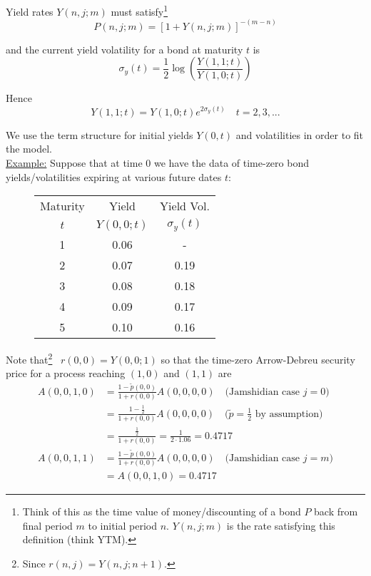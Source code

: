 \documentclass[12pt]{article}
\newlength\tindent
\renewcommand{\indent}{\hspace*{\tindent}}
\begin{document}
Yield rates $Y(n,j;m)$ must satisfy\footnote{Think of this as the time value of money/discounting of a bond $P$ back from final period $m$ to initial period $n$. $Y(n,j;m)$ is the rate satisfying this definition (think YTM).}
\begin{equation*}
	P(n,j;m) = [1 + Y(n,j;m)]^{-(m-n)}
\end{equation*}

and the current yield volatility for a bond at maturity $t$ is
\begin{equation*}
	\sigma_y(t) = \frac{1}{2} \log \left( \frac{Y(1,1;t)}{Y(1,0;t)} \right)
\end{equation*}

Hence
\begin{equation*}
	Y(1,1;t) = Y(1,0;t)e^{2\sigma_y(t)} \quad t = 2,3,...
\end{equation*}

We use the term structure for initial yields $Y(0,t)$ and volatilities in order to fit the model. \\

\underline{Example:} Suppose that at time 0 we have the data of time-zero bond yields/volatilities expiring at various future dates $t$:
\begin{figure}[H]
\centering
\begin{tabular}{ccc}
\hline
	Maturity & Yield & Yield Vol. \\
	$t$ & $Y(0,0;t)$ & $\sigma_y(t)$ \\
\hline
	1 & 0.06 & - \\
	2 & 0.07 & 0.19 \\
	3 & 0.08 & 0.18 \\
	4 & 0.09 & 0.17 \\
	5 & 0.10 & 0.16	
\end{tabular}
\end{figure}

\indent Note that\footnote{Since $r(n,j) = Y(n,j;n + 1)$.}~ $r(0,0) = Y(0,0;1)$ so that the time-zero Arrow-Debreu security price for a process reaching $(1,0)$ and $(1,1)$ are 
\begin{align*}
	A(0,0,1,0) &= \frac{1 - \tilde{p}(0,0)}{1 + r(0,0)} A(0,0,0,0) \quad \text{(Jamshidian case $j = 0$)} \\
	&= \frac{1 - \frac{1}{2}}{1 + r(0,0)} A(0,0,0,0) \quad (\tilde{p} = \frac{1}{2} \text{ by assumption)} \\
	&= \frac{\frac{1}{2}}{1 + r(0,0)} = \frac{1}{2\cdot 1.06} = 0.4717 \\
	A(0,0,1,1) &=  \frac{1 - \tilde{p}(0,0)}{1 + r(0,0)} A(0,0,0,0) \quad \text{(Jamshidian case $j = m$)} \\
	&= A(0,0,1,0) = 0.4717
\end{align*}
\end{document}
